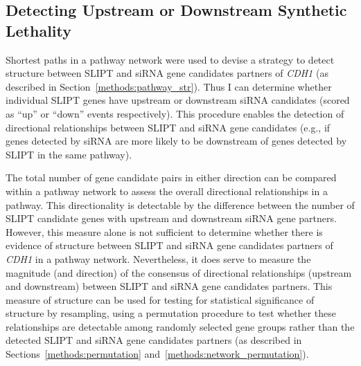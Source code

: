 
\FloatBarrier

\subsection{Detecting Upstream or Downstream Synthetic Lethality}  \label{chapt4:Structure_GPCR}

Shortest paths in a \gls{pathway} network were used to devise a strategy to detect  structure between \gls{SLIPT} and \gls{siRNA} gene candidates partners of \textit{CDH1} (as described in Section~\ref{methods:pathway_str}). Thus I can determine whether individual \gls{SLIPT} genes have upstream or downstream \gls{siRNA} candidates (scored as ``up'' or ``down'' events respectively). This procedure enables the detection of directional relationships between \gls{SLIPT} and \gls{siRNA} gene candidates (e.g., if genes detected by \gls{siRNA} are more likely to be downstream of genes detected by \gls{SLIPT} in the same pathway). %

The total number of gene candidate pairs in either direction can be compared within a \gls{pathway} network to assess the overall directional relationships in a \gls{pathway}. This directionality is detectable by the difference between the number of \gls{SLIPT} candidate genes with upstream and downstream \gls{siRNA} gene partners. However, this measure alone is not sufficient to determine whether there is evidence of  structure between \gls{SLIPT} and \gls{siRNA} gene candidates partners of \textit{CDH1} in a \gls{pathway} network. Nevertheless, it does serve to measure the magnitude (and direction) of the consensus of directional relationships (upstream and downstream) between \gls{SLIPT} and \gls{siRNA} gene candidates partners. This measure of  structure can be used for testing for statistical significance of  structure by resampling, using a permutation procedure to test whether these relationships are detectable among randomly selected gene groups rather than the detected \gls{SLIPT} and \gls{siRNA} gene candidates partners (as described in Sections~\ref{methods:permutation} and~\ref{methods:network_permutation}).

